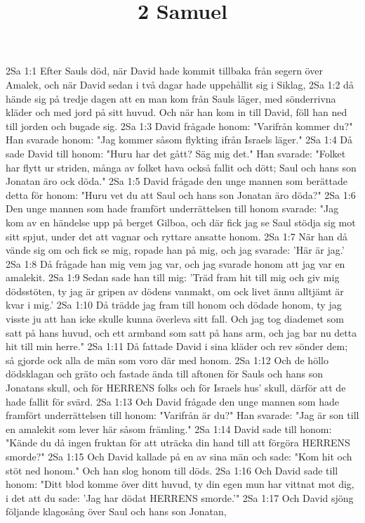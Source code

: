 

\title{2 Samuel}

2Sa 1:1  Efter Sauls död, när David hade kommit tillbaka från segern över Amalek, och när David sedan i två dagar hade uppehållit sig i Siklag,
2Sa 1:2  då hände sig på tredje dagen att en man kom från Sauls läger, med sönderrivna kläder och med jord på sitt huvud. Och när han kom in till David, föll han ned till jorden och bugade sig.
2Sa 1:3  David frågade honom: "Varifrån kommer du?" Han svarade honom: "Jag kommer såsom flykting ifrån Israels läger."
2Sa 1:4  Då sade David till honom: "Huru har det gått? Säg mig det." Han svarade: "Folket har flytt ur striden, många av folket hava också fallit och dött; Saul och hans son Jonatan äro ock döda."
2Sa 1:5  David frågade den unge mannen som berättade detta för honom: "Huru vet du att Saul och hans son Jonatan äro döda?"
2Sa 1:6  Den unge mannen som hade framfört underrättelsen till honom svarade: "Jag kom av en händelse upp på berget Gilboa, och där fick jag se Saul stödja sig mot sitt spjut, under det att vagnar och ryttare ansatte honom.
2Sa 1:7  När han då vände sig om och fick se mig, ropade han på mig, och jag svarade: 'Här är jag.'
2Sa 1:8  Då frågade han mig vem jag var, och jag svarade honom att jag var en amalekit.
2Sa 1:9  Sedan sade han till mig: 'Träd fram hit till mig och giv mig dödsstöten, ty jag är gripen av dödens vanmakt, om ock livet ännu alltjämt är kvar i mig.'
2Sa 1:10  Då trädde jag fram till honom och dödade honom, ty jag visste ju att han icke skulle kunna överleva sitt fall. Och jag tog diademet som satt på hans huvud, och ett armband som satt på hans arm, och jag bar nu detta hit till min herre."
2Sa 1:11  Då fattade David i sina kläder och rev sönder dem; så gjorde ock alla de män som voro där med honom.
2Sa 1:12  Och de höllo dödsklagan och gräto och fastade ända till aftonen för Sauls och hans son Jonatans skull, och för HERRENS folks och för Israels hus' skull, därför att de hade fallit för svärd.
2Sa 1:13  Och David frågade den unge mannen som hade framfört underrättelsen till honom: "Varifrån är du?" Han svarade: "Jag är son till en amalekit som lever här såsom främling."
2Sa 1:14  David sade till honom: "Kände du då ingen fruktan för att uträcka din hand till att förgöra HERRENS smorde?"
2Sa 1:15  Och David kallade på en av sina män och sade: "Kom hit och stöt ned honom." Och han slog honom till döds.
2Sa 1:16  Och David sade till honom: "Ditt blod komme över ditt huvud, ty din egen mun har vittnat mot dig, i det att du sade: 'Jag har dödat HERRENS smorde.'"
2Sa 1:17  Och David sjöng följande klagosång över Saul och hans son Jonatan,
